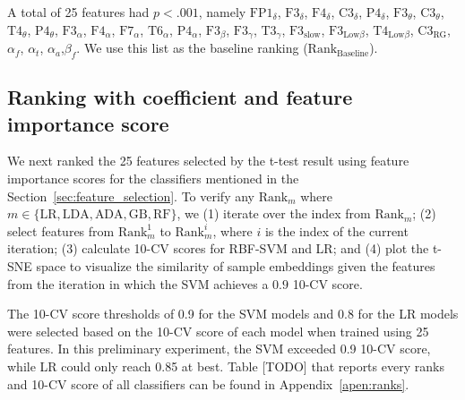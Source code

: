 \documentclass[pdflatex,sn-mathphys]{sn-jnl}%
\theoremstyle{thmstyleone}%
\theoremstyle{thmstyletwo}%
\theoremstyle{thmstylethree}%
\begin{document}
\begin{table}[h!]
\caption{Results for the t-test on asymmetries}
    \label{tab:featureselection2}
\end{table}

A total of 25 features had $p < .001$, namely $\text{FP1}_{\delta}$, $\text{F3}_{\delta}$, $\text{F4}_{\delta}$, $\text{C3}_{\delta}$, $\text{P4}_{\delta}$, $\text{F3}_{\theta}$, $\text{C3}_{\theta}$, $\text{T4}_{\theta}$, $\text{P4}_{\theta}$, $\text{F3}_{\alpha}$, $\text{F4}_{\alpha}$, $\text{F7}_{\alpha}$, $\text{T6}_{\alpha}$, $\text{P4}_{\alpha}$, $\text{F3}_{\beta}$, $\text{F3}_{\gamma}$, $\text{T3}_{\gamma}$, $\text{F3}_\text{slow}$, $\text{F3}_{\text{Low}\beta}$, $\text{T4}_{\text{Low}\beta}$, $\text{C3}_{\text{RG}}$, $\alpha_{f}$, $\alpha_{t}$, $\alpha_{a}$,$\beta_{f}$. We use this list as the baseline ranking ($\text{Rank}_{\text{Baseline}}$).

\subsection{Ranking with coefficient and feature importance score}

We next ranked the 25 features selected by the t-test result using feature importance scores for the classifiers mentioned in the Section~\ref{sec:feature_selection}. To verify any $\text{Rank}_{m}$ where $m \in \{\text{LR}, \text{LDA}, \text{ADA}, \text{GB}, \text{RF}\}$, we (1) iterate over the index from $\text{Rank}_{m}$; (2) select features from $\text{Rank}_{m}^{1}$ to $\text{Rank}_{m}^{i}$, where $i$ is the index of the current iteration; (3) calculate 10-CV scores for RBF-SVM and LR; and (4) plot the t-SNE space to visualize the similarity of sample embeddings given the features from the iteration in which the SVM achieves a $0.9$ 10-CV score.

The 10-CV score thresholds of 0.9 for the SVM models and 0.8 for the LR models were selected based on the 10-CV score of each model when trained using 25 features. In this preliminary experiment, the SVM exceeded 0.9 10-CV score, while LR could only reach 0.85 at best. Table [TODO] that reports every ranks and 10-CV score of all classifiers can be found in Appendix~\ref{apen:ranks}.
\end{document}
